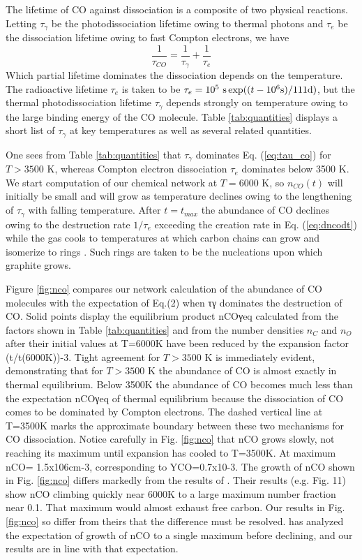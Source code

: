 \documentclass[manuscript]{aastex}
\begin{document}
The lifetime of CO against dissociation is a composite of two physical
reactions. Letting $\tau_\gamma$ be the photodissociation lifetime owing
to thermal photons and $\tau_e$ be the dissociation lifetime owing to fast
Compton electrons, we have
\begin{equation}
\frac{1}{\tau_{CO}} = \frac{1}{\tau_\gamma} + \frac{1}{\tau_e}
\label{eq:tau_co}
\end{equation}
Which partial lifetime dominates the dissociation depends on the temperature.
The radioactive lifetime $\tau_e$ is taken to be
$\tau_e = 10^5\ {\rm s} \exp( ( t -10^6{\rm s}) / 111 {\rm d} )$,
but the thermal photodissociation lifetime $\tau_\gamma$
depends strongly on temperature
owing to the large binding energy of the CO molecule.
Table \ref{tab:quantities} displays a
short list of $\tau_\gamma$ at key temperatures as well as several related
quantities.

One sees from Table \ref{tab:quantities}
that $\tau_\gamma$ dominates Eq. (\ref{eq:tau_co}) for $T > 3500$ K,
whereas Compton
electron dissociation $\tau_e$
dominates below 3500 K. We start computation of our
chemical network at $T = 6000$ K,
so $n_{CO}(t)$ will initially be small and will
grow as temperature declines owing to the lengthening of $\tau_\gamma$ with
falling temperature. After $t=t_{max}$ the abundance of CO declines owing to
the destruction rate $1/\tau_e$ exceeding the creation rate in
Eq. (\ref{eq:dncodt})
while the gas cools to temperatures at which carbon chains can grow and
isomerize to rings \citep{1999Sci...283.1290C}. Such rings are taken to be
the nucleations upon which graphite grows.

Figure \ref{fig:nco}
compares our network calculation of the abundance of CO molecules
with the expectation of Eq.(2) when τγ dominates the destruction of CO.
Solid points display the equilibrium product nCOγeq calculated from the
factors shown in Table \ref{tab:quantities}
and from the number densities $n_C$ and $n_O$ after
their initial values at T=6000K have been reduced by the expansion factor
(t/t(6000K))-3. Tight agreement for $T > 3500$ K is immediately evident,
demonstrating that for $T > 3500$ K the abundance of CO is almost exactly in
thermal equilibrium. Below 3500K the abundance of CO becomes much less than
the expectation nCOγeq  of thermal equilibrium because the dissociation of CO
comes to be dominated by Compton electrons. The dashed vertical line at
T=3500K marks the approximate boundary between these two mechanisms for CO
dissociation. Notice carefully in Fig. \ref{fig:nco}
that nCO grows slowly, not reaching
its maximum until expansion has cooled to T=3500K.
At maximum nCO= 1.5x106cm-3, corresponding to YCO=0.7x10-3. The growth of nCO
shown in Fig. \ref{fig:nco} differs markedly from the results of
\citet{2009ApJ...703..642C}.
Their results (e.g. Fig. 11) show nCO climbing quickly near 6000K to a large
maximum number fraction near 0.1. That maximum would almost exhaust free
carbon. Our results in Fig. \ref{fig:nco}
so differ from theirs that the difference
must be resolved. \citet{2013ApJ...762....5C} has analyzed the expectation
of growth of nCO to a single maximum before declining, and our results are
in line with that expectation. 
\end{document}
